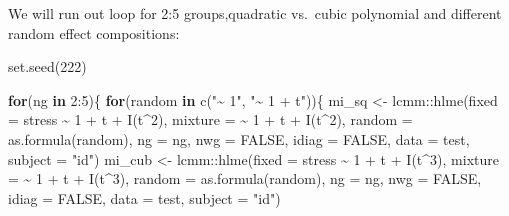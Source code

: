 \documentclass[
]{book}
\newenvironment{Shaded}{\begin{snugshade}}{\end{snugshade}}
\newcommand{\AttributeTok}[1]{\textcolor[rgb]{0.77,0.63,0.00}{#1}}
\newcommand{\ConstantTok}[1]{\textcolor[rgb]{0.00,0.00,0.00}{#1}}
\newcommand{\ControlFlowTok}[1]{\textcolor[rgb]{0.13,0.29,0.53}{\textbf{#1}}}
\newcommand{\DecValTok}[1]{\textcolor[rgb]{0.00,0.00,0.81}{#1}}
\newcommand{\FunctionTok}[1]{\textcolor[rgb]{0.00,0.00,0.00}{#1}}
\newcommand{\NormalTok}[1]{#1}
\newcommand{\OtherTok}[1]{\textcolor[rgb]{0.56,0.35,0.01}{#1}}
\newcommand{\SpecialCharTok}[1]{\textcolor[rgb]{0.00,0.00,0.00}{#1}}
\newcommand{\StringTok}[1]{\textcolor[rgb]{0.31,0.60,0.02}{#1}}
\begin{document}
We will run out loop for 2:5 groups,quadratic vs.~cubic polynomial and different random effect compositions:

\begin{Shaded}
\begin{Highlighting}[]
\FunctionTok{set.seed}\NormalTok{(}\DecValTok{222}\NormalTok{)}

\ControlFlowTok{for}\NormalTok{(ng }\ControlFlowTok{in} \DecValTok{2}\SpecialCharTok{:}\DecValTok{5}\NormalTok{)\{}
  \ControlFlowTok{for}\NormalTok{(random }\ControlFlowTok{in} \FunctionTok{c}\NormalTok{(}\StringTok{"\textasciitilde{} 1"}\NormalTok{, }\StringTok{"\textasciitilde{} 1 + t"}\NormalTok{))\{}
\NormalTok{    mi\_sq }\OtherTok{\textless{}{-}}\NormalTok{ lcmm}\SpecialCharTok{::}\FunctionTok{hlme}\NormalTok{(}\AttributeTok{fixed =}\NormalTok{ stress }\SpecialCharTok{\textasciitilde{}} \DecValTok{1} \SpecialCharTok{+}\NormalTok{ t }\SpecialCharTok{+} \FunctionTok{I}\NormalTok{(t}\SpecialCharTok{\^{}}\DecValTok{2}\NormalTok{),}
                        \AttributeTok{mixture =} \SpecialCharTok{\textasciitilde{}} \DecValTok{1} \SpecialCharTok{+}\NormalTok{ t }\SpecialCharTok{+} \FunctionTok{I}\NormalTok{(t}\SpecialCharTok{\^{}}\DecValTok{2}\NormalTok{),}
                        \AttributeTok{random =} \FunctionTok{as.formula}\NormalTok{(random),}
                        \AttributeTok{ng =}\NormalTok{ ng,}
                        \AttributeTok{nwg =} \ConstantTok{FALSE}\NormalTok{,}
                        \AttributeTok{idiag =} \ConstantTok{FALSE}\NormalTok{,}
                        \AttributeTok{data =}\NormalTok{ test,}
                        \AttributeTok{subject =} \StringTok{"id"}\NormalTok{)}
\NormalTok{    mi\_cub }\OtherTok{\textless{}{-}}\NormalTok{ lcmm}\SpecialCharTok{::}\FunctionTok{hlme}\NormalTok{(}\AttributeTok{fixed =}\NormalTok{ stress }\SpecialCharTok{\textasciitilde{}} \DecValTok{1} \SpecialCharTok{+}\NormalTok{ t }\SpecialCharTok{+} \FunctionTok{I}\NormalTok{(t}\SpecialCharTok{\^{}}\DecValTok{3}\NormalTok{),}
                         \AttributeTok{mixture =} \SpecialCharTok{\textasciitilde{}} \DecValTok{1} \SpecialCharTok{+}\NormalTok{ t }\SpecialCharTok{+} \FunctionTok{I}\NormalTok{(t}\SpecialCharTok{\^{}}\DecValTok{3}\NormalTok{),}
                         \AttributeTok{random =} \FunctionTok{as.formula}\NormalTok{(random),}
                         \AttributeTok{ng =}\NormalTok{ ng,}
                         \AttributeTok{nwg =} \ConstantTok{FALSE}\NormalTok{,}
                         \AttributeTok{idiag =} \ConstantTok{FALSE}\NormalTok{,}
                         \AttributeTok{data =}\NormalTok{ test,}
                         \AttributeTok{subject =} \StringTok{"id"}\NormalTok{)}


\end{Highlighting}
\end{Shaded}
\end{document}
